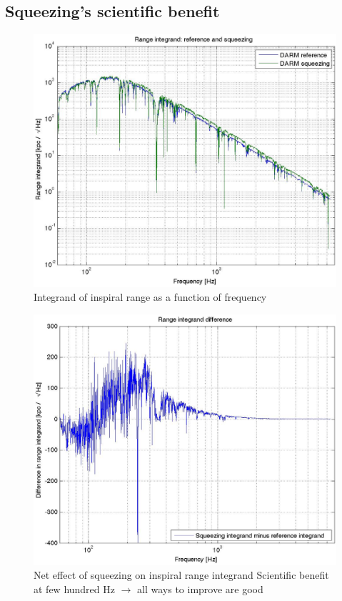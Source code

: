 
\subsection{Squeezing's scientific benefit}


\begin{figure}
\includegraphics[height=0.5\paperheight, width=0.5\paperwidth,keepaspectratio]{range_integrand.eps}
\caption{Integrand of inspiral range as a function of frequency}
\end{figure}
\begin{figure}
\includegraphics[height=0.5\paperheight, width=0.5\paperwidth,keepaspectratio]{range_integrand_difference.eps}
\caption{Net effect of squeezing on inspiral range integrand
\newline Scientific benefit at few hundred Hz $\rightarrow$ all ways to improve are good
}
\end{figure}




